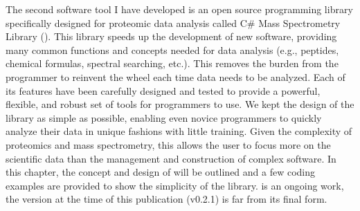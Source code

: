 The second software tool I have developed is an open source programming library specifically designed for proteomic data analysis called C\# Mass Spectrometry Library (\csmsl{}). This library speeds up the development of new software, providing many common functions and concepts needed for data analysis (e.g., peptides, chemical formulas, spectral searching, etc.). This removes the burden from the programmer to reinvent the wheel each time data needs to be analyzed. Each of its features have been carefully designed and tested to provide a powerful, flexible, and robust set of tools for programmers to use. We kept the design of the library as simple as possible, enabling even novice programmers to quickly analyze their data in unique fashions with little training. Given the complexity of proteomics and mass spectrometry, this allows the user to focus more on the scientific data than the management and construction of complex software. In this chapter, the concept and design of \csmsl{} will be outlined and a few coding examples are provided to show the simplicity of the library. \csmsl{} is an ongoing work, the version at the time of this publication (v0.2.1) is far from its final form. 

